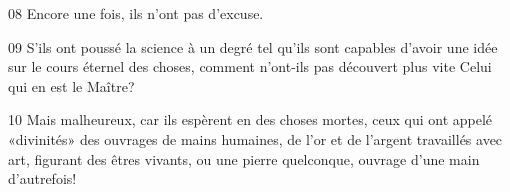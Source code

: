 
08 Encore une fois, ils n’ont pas d’excuse.

09 S’ils ont poussé la science à un degré tel qu’ils sont capables d’avoir une idée sur le cours éternel des choses, comment n’ont-ils pas découvert plus vite Celui qui en est le Maître?

10 Mais malheureux, car ils espèrent en des choses mortes, ceux qui ont appelé «divinités» des ouvrages de mains humaines, de l’or et de l’argent travaillés avec art, figurant des êtres vivants, ou une pierre quelconque, ouvrage d’une main d’autrefois!